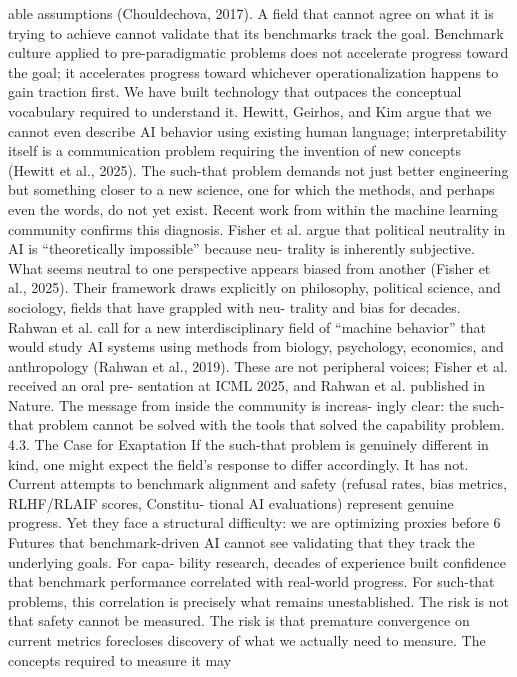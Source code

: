 able assumptions (Chouldechova, 2017). A field that cannot
agree on what it is trying to achieve cannot validate that
its benchmarks track the goal. Benchmark culture applied
to pre-paradigmatic problems does not accelerate progress
toward the goal; it accelerates progress toward whichever
operationalization happens to gain traction first. We have
built technology that outpaces the conceptual vocabulary
required to understand it. Hewitt, Geirhos, and Kim argue
that we cannot even describe AI behavior using existing
human language; interpretability itself is a communication
problem requiring the invention of new concepts (Hewitt
et al., 2025). The such-that problem demands not just better
engineering but something closer to a new science, one for
which the methods, and perhaps even the words, do not yet
exist.
Recent work from within the machine learning community
confirms this diagnosis. Fisher et al. argue that political
neutrality in AI is “theoretically impossible” because neu-
trality is inherently subjective. What seems neutral to one
perspective appears biased from another (Fisher et al., 2025).
Their framework draws explicitly on philosophy, political
science, and sociology, fields that have grappled with neu-
trality and bias for decades. Rahwan et al. call for a new
interdisciplinary field of “machine behavior” that would
study AI systems using methods from biology, psychology,
economics, and anthropology (Rahwan et al., 2019). These
are not peripheral voices; Fisher et al. received an oral pre-
sentation at ICML 2025, and Rahwan et al. published in
Nature. The message from inside the community is increas-
ingly clear: the such-that problem cannot be solved with the
tools that solved the capability problem.
4.3. The Case for Exaptation
If the such-that problem is genuinely different in kind, one
might expect the field’s response to differ accordingly. It has
not. Current attempts to benchmark alignment and safety
(refusal rates, bias metrics, RLHF/RLAIF scores, Constitu-
tional AI evaluations) represent genuine progress. Yet they
face a structural difficulty: we are optimizing proxies before
6
Futures that benchmark-driven AI cannot see
validating that they track the underlying goals. For capa-
bility research, decades of experience built confidence that
benchmark performance correlated with real-world progress.
For such-that problems, this correlation is precisely what
remains unestablished. The risk is not that safety cannot
be measured. The risk is that premature convergence on
current metrics forecloses discovery of what we actually
need to measure. The concepts required to measure it may
